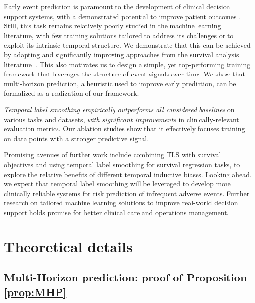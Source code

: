 \documentclass[nohyperref]{article}
\begin{document}
Early event prediction is paramount to the development of clinical decision support systems, with a demonstrated potential to improve patient outcomes \citep{smith2013}. Still, this task remains relatively poorly studied in the machine learning literature, with few training solutions tailored to address its challenges or to exploit its intrinsic temporal structure. We demonstrate that this can be achieved by adapting and significantly improving approaches from the survival analysis literature~\citep{van2007dynamic, parast2014landmark}. This also motivates us to design a simple, yet top-performing training framework that leverages the structure of event signals over time. We show that multi-horizon prediction, a heuristic used to improve early prediction, can be formalized as a realization of our framework. 

{\it Temporal label smoothing empirically outperforms all considered baselines} on various tasks and datasets, {\it with significant improvements} in clinically-relevant evaluation metrics. Our ablation studies show that it effectively focuses training on data points with a stronger predictive signal.





Promising avenues of further work include combining TLS with survival objectives and using temporal label smoothing for survival regression tasks, to explore the relative benefits of different temporal inductive biases. Looking ahead, we expect that temporal label smoothing will be leveraged to develop more clinically reliable systems for risk prediction of infrequent adverse events. Further research on tailored machine learning solutions to improve real-world decision support holds promise for better clinical care and operations management.


\newpage



\appendix
\newpage
\onecolumn



\section{Theoretical details} 

\subsection{Multi-Horizon prediction: proof of Proposition \ref{prop:MHP}}
\label{appendix:MHP_link}
\end{document}
